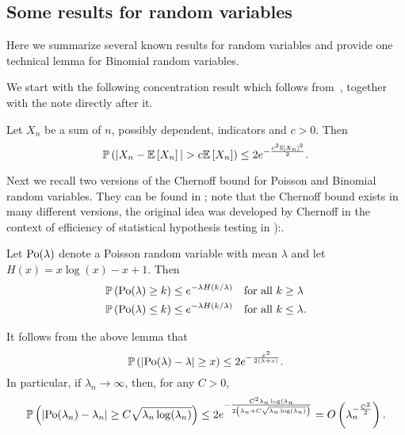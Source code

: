 \begin{appendices}
\section{Some results for random variables}

Here we summarize several known results for random variables and provide one technical lemma for Binomial random variables.

We start with the following concentration result which follows from~\cite[Theorem 4]{freedman1973another}, together with the note directly after it.

\begin{lemma}\label{lem:general_concentration_sum_indicators}
Let $X_n$ be a sum of $n$, possibly dependent, indicators and $c > 0$. Then
\[
	\mathbb{P}\left(|X_n - \mathbb{E}\left[X_n\right]| > c \mathbb{E}\left[X_n\right]\right) \le 2 e^{-\frac{c^2 \mathbb{E}\left[X_n\right]^2}{2}}.
\]
\end{lemma}

Next we recall two versions of the Chernoff bound for Poisson and Binomial random variables. They can be found in \cite[Lemma 1.2]{penrose2003random}; note that the Chernoff bound exists in many different versions, the original idea was developed by Chernoff in the context of efficiency of statistical hypothesis testing in \cite{Chernoff1952}):.

\begin{lemma}
Let ${\mathrm{Po}}(\lambda)$ denote a Poisson random variable with mean $\lambda$ and let $H(x) = x\log(x) - x + 1$. Then
\begin{align*}
	&\mathbb{P}\left({\mathrm{Po}}(\lambda) \ge k\right) \le e^{-\lambda H(k/\lambda)} \quad \text{for all } k \ge \lambda\\
	&\mathbb{P}\left({\mathrm{Po}}(\lambda) \le k\right) \le e^{-\lambda H(k/\lambda)} \quad \text{for all } k \le \lambda.
\end{align*}
\end{lemma}

It follows from the above lemma that
\begin{equation*}
	\mathbb{P}\left(\left|\mathrm{Po}(\lambda) - \lambda\right| \ge x\right) \le 2e^{-\frac{x^2}{2(\lambda + x)}}.
\end{equation*}
In particular, if $\lambda_n \to \infty$, then, for any $C>0$,
\begin{equation*}
	\mathbb{P}\left(\left|\mathrm{Po}(\lambda_n) - \lambda_n\right| \ge C \sqrt{\lambda_n\log(\lambda_n)}\right) \le 2e^{-\frac{C^2 \lambda_n \log(\lambda_n}{2\left(\lambda_n + C\sqrt{\lambda_n\log(\lambda_n)}\right)}}
	= O\left(\lambda_n^{-\frac{C^2}{2}}\right).
\end{equation*}


\end{appendices}
